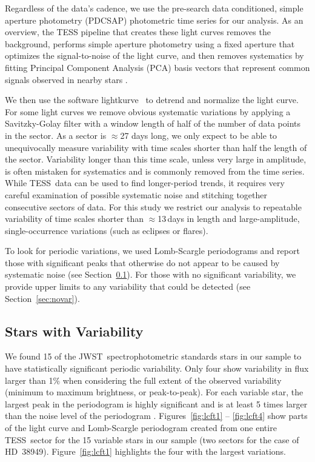 \documentclass[twocolumn, linenumbers]{aastex631}
\newcommand{\webb}{JWST}
\newcommand{\tess}{TESS}
\newcommand{\lightkurve}{{{\fontfamily{lmtt}\selectfont lightkurve}}}
\begin{document}
Regardless of the data's cadence, we use the pre-search data conditioned, simple aperture photometry (PDCSAP) photometric time series \citep{kdph2020PDC} for our analysis. As an overview, the TESS pipeline that creates these light curves removes the background, performs simple aperture photometry using a fixed aperture that optimizes the signal-to-noise of the light curve, and then removes systematics by fitting Principal Component Analysis (PCA) basis vectors that represent common signals observed in nearby stars \citep{Smith2012,Stumpe2012PASP}. 

We then use the software \lightkurve\ \citep{lightkurve} to detrend and normalize the light curve. For some light curves we remove obvious systematic variations by applying a Savitzky-Golay filter \citep{savgol1964AnaCh..36.1627S} with a window length of half of the number of data points in the sector. As a sector is $\approx$27 days long, we only expect to be able to unequivocally measure variability with time scales shorter than half the length of the sector.  Variability longer than this time scale, unless very large in amplitude, is often mistaken for systematics and is commonly removed from the time series. While \tess\ data can be used to find longer-period trends, it requires very careful examination of possible systematic noise and stitching together consecutive sectors of data. For this study we restrict our analysis to repeatable variability of time scales shorter than $\approx$13\,days in length and large-amplitude, single-occurrence variations (such as eclipses or flares).

To look for periodic variations, we used Lomb-Scargle periodograms \citep{Lomb1976,lightkurve} and report those with significant peaks that otherwise do not appear to be caused by systematic noise (see Section~\ref{sec:var}).  For those with no significant variability, we provide upper limits to any variability that could be detected (see Section~\ref{sec:novar}).

\subsection{Stars with Variability}
\label{sec:var}

We found 15 of the \webb\ spectrophotometric standards stars in our sample to have statistically significant periodic variability. Only four show variability in flux larger than 1\% when considering the full extent of the observed variability (minimum to maximum brightness, or peak-to-peak).  For each variable star, the largest peak in the periodogram is highly significant and is at least 5 times larger than the noise level of the periodogram \citep{KjeldsenBedding1995, Baran2021}. Figures~\ref{fig:lcft1} -- \ref{fig:lcft4} show parts of the light curve and Lomb-Scargle periodogram created from one entire \tess\ sector for the 15 variable stars in our sample (two sectors for the case of HD~38949). 
Figure~\ref{fig:lcft1} highlights the four with the largest variations.  
\end{document}
